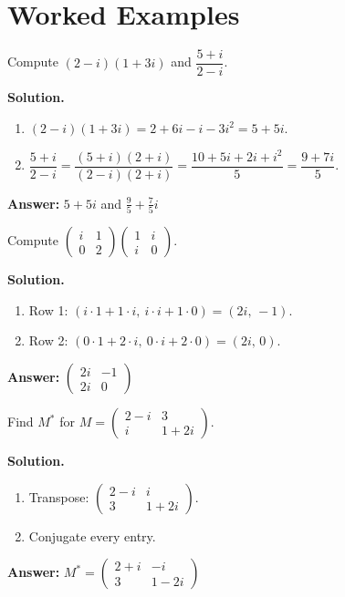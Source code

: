 \documentclass[11pt]{article}
\begin{document}
\newpage
\section*{\large\color{ink} Worked Examples}
\begin{tcolorbox}[colback=white,colframe=ink!60,title={\bfseries Example 1 \textperiodcentered\ Complex arithmetic}]Compute $(2-i)(1+3i)$ and $\dfrac{5+i}{2-i}$.
\par\smallskip
\textbf{Solution.} \begin{enumerate}[leftmargin=1.6em,itemsep=1pt,topsep=2pt,label=\arabic*.]\item $(2-i)(1+3i)=2+6i-i-3i^{2}=5+5i$.
\item $\dfrac{5+i}{2-i}=\dfrac{(5+i)(2+i)}{(2-i)(2+i)}=\dfrac{10+5i+2i+i^{2}}{5}=\dfrac{9+7i}{5}$.
\end{enumerate}\textbf{Answer:} $5+5i$ and $\tfrac95+\tfrac75i$
\end{tcolorbox}
\begin{tcolorbox}[colback=white,colframe=ink!60,title={\bfseries Example 2 \textperiodcentered\ Product over $\mathbb{C}$}]Compute $\begin{pmatrix}i&1\\0&2\end{pmatrix}\begin{pmatrix}1&i\\i&0\end{pmatrix}$.
\par\smallskip
\textbf{Solution.} \begin{enumerate}[leftmargin=1.6em,itemsep=1pt,topsep=2pt,label=\arabic*.]\item Row 1: $(i\cdot1+1\cdot i,\ i\cdot i+1\cdot0)=(2i,\,-1)$.
\item Row 2: $(0\cdot1+2\cdot i,\ 0\cdot i+2\cdot0)=(2i,\,0)$.
\end{enumerate}\textbf{Answer:} $\begin{pmatrix}2i&-1\\2i&0\end{pmatrix}$
\end{tcolorbox}
\begin{tcolorbox}[colback=white,colframe=ink!60,title={\bfseries Example 3 \textperiodcentered\ Conjugate transpose}]Find $M^{*}$ for $M=\begin{pmatrix}2-i&3\\i&1+2i\end{pmatrix}$.
\par\smallskip
\textbf{Solution.} \begin{enumerate}[leftmargin=1.6em,itemsep=1pt,topsep=2pt,label=\arabic*.]\item Transpose: $\begin{pmatrix}2-i&i\\3&1+2i\end{pmatrix}$.
\item Conjugate every entry.
\end{enumerate}\textbf{Answer:} $M^{*}=\begin{pmatrix}2+i&-i\\3&1-2i\end{pmatrix}$
\end{tcolorbox}
\end{document}
